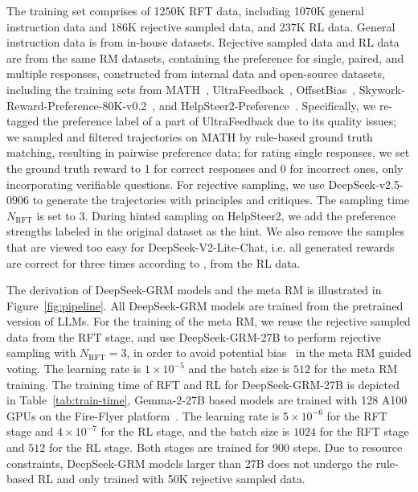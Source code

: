 \documentclass{article} %
\newcommand{\SGRM}{DeepSeek-GRM-27B\xspace}
\newcommand{\SGRMAll}{DeepSeek-GRM\xspace}
\begin{document}
The training set comprises of 1250K RFT data, including 1070K general instruction data and 186K rejective sampled data, and 237K RL data. General instruction data is from in-house datasets. Rejective sampled data and RL data are from the same RM datasets, containing the preference for single, paired, and multiple responses, constructed from internal data and open-source datasets, including the training sets from MATH~\citep{hendrycks2021measuring}, UltraFeedback~\citep{pmlr-v235-cui24f}, OffsetBias~\citep{park-etal-2024-offsetbias}, 
Skywork-Reward-Preference-80K-v0.2~\citep{liu2024skyworkrewardbagtricksreward}, and HelpSteer2-Preference~\citep{wang2025helpsteerpreference}. Specifically, we re-tagged the preference label of a part of UltraFeedback due to its quality issues; we sampled and filtered trajectories on MATH by rule-based ground truth matching, resulting in pairwise preference data; for rating single responses, we set the ground truth reward to 1 for correct responses and 0 for incorrect ones, only incorporating verifiable questions. 
For rejective sampling, we use DeepSeek-v2.5-0906 to generate the trajectories with principles and critiques. The sampling time $N_{\mathrm{RFT}}$ is set to 3. During hinted sampling on HelpSteer2, we add the preference strengths labeled in the original dataset as the hint. We also remove the samples that are viewed too easy for DeepSeek-V2-Lite-Chat, i.e. all generated rewards are correct for three times according to , from the RL data. 

The derivation of \SGRMAll models and the meta RM is illustrated in Figure~\ref{fig:pipeline}. All \SGRMAll models are trained from the pretrained version of LLMs. For the training of the meta RM, we reuse the rejective sampled data from the RFT stage, and use \SGRM to perform rejective sampling with $N_{\mathrm{RFT}} = 3$, in order to avoid potential bias~\citep{chow2025inferenceaware} in the meta RM guided voting. The learning rate is $1\times10^{-5}$ and the batch size is $512$ for the meta RM training. 
The training time of RFT and RL for \SGRM is depicted in Table~\ref{tab:train-time}, Gemma-2-27B based models are trained with 128 A100 GPUs on the Fire-Flyer platform~\citep{an2024fireflyeraihpccosteffectivesoftwarehardware}. The learning rate is $5\times10^{-6}$ for the RFT stage and $4\times10^{-7}$ for the RL stage, and the batch size is $1024$ for the RFT stage and $512$ for the RL stage. Both stages are trained for 900 steps. Due to resource constraints, \SGRMAll models larger than 27B does not undergo the rule-based RL and only trained with 50K rejective sampled data.  
\end{document}
